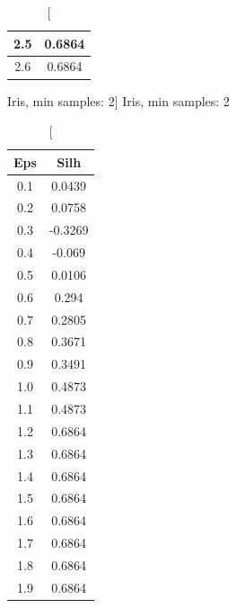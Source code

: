 \documentclass{classrep}
\begin{document}
{{{\begin{table}[!htbp]
\begin{minipage}{.24\textwidth}
\begin{tabular}{|c|c|}
                            2.5 & 0.6864 \\ \hline
                            2.6 & 0.6864 \\ \hline
                        \end{tabular}
                        \caption
                        [Iris, min samples: 2]
                        {Iris, min samples: 2}
                        \label{db_scan_table_Iris_manh_min_sample2}
                    \end{minipage}
                    \hfill
                    \begin{minipage}{.24\textwidth}
                        \centering
                        \begin{tabular}{|c|c|}
                            \hline
                            Eps & Silh \\ \hline
                            0.1 & 0.0439 \\ \hline
                            0.2 & 0.0758 \\ \hline
                            0.3 & -0.3269 \\ \hline
                            0.4 & -0.069 \\ \hline
                            0.5 & 0.0106 \\ \hline
                            0.6 & 0.294 \\ \hline
                            0.7 & 0.2805 \\ \hline
                            0.8 & 0.3671 \\ \hline
                            0.9 & 0.3491 \\ \hline
                            1.0 & 0.4873 \\ \hline
                            1.1 & 0.4873 \\ \hline
                            1.2 & 0.6864 \\ \hline
                            1.3 & 0.6864 \\ \hline
                            1.4 & 0.6864 \\ \hline
                            1.5 & 0.6864 \\ \hline
                            1.6 & 0.6864 \\ \hline
                            1.7 & 0.6864 \\ \hline
                            1.8 & 0.6864 \\ \hline
                            1.9 & 0.6864 \\ \hline

\end{tabular}
\end{minipage}
\end{table}}}}
\end{document}
